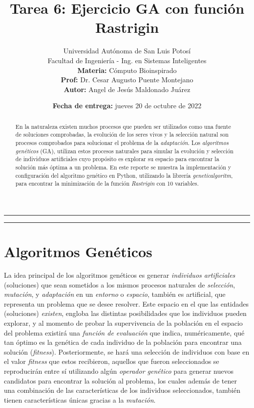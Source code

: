 \documentclass[a4paper, 12pt]{article}
\title{\vspace{-3cm}Tarea 6: Ejercicio GA con función Rastrigin}
\author{
    Universidad Autónoma de San Luis Potosí\\ 
    Facultad de Ingeniería - Ing. en Sistemas Inteligentes\\ 
    \textbf{Materia:} Cómputo Bioinspirado \\
    \textbf{Prof:} Dr. Cesar Augusto Puente Montejano  \\
    \textbf{Autor:} Angel de Jesús Maldonado Juárez
}
\date{\textbf{Fecha de entrega:} jueves 20 de octubre de 2022}
\begin{document}
\maketitle

\begin{center}
    \rule{\textwidth}{0.5pt}
    \begin{abstract}
        \noindent En la naturaleza existen muchos procesos que pueden ser utilizados como una fuente de soluciones comprobadas, la evolución de los seres vivos y la selección natural son procesos comprobados para solucionar el problema de la \emph{adaptación}. Los \emph{algoritmos genéticos} (GA), utilizan estos procesos naturales para simular la evolución y selección de individuos artificiales cuyo propósito es explorar su espacio para encontrar la solución más óptima a un problema. En este reporte se muestra la implementación y configuración del algoritmo genético en Python, utilizando la librería \emph{geneticalgoritm}, para encontrar la minimización de la función \emph{Rastrigin} con 10 variables.
    \end{abstract}
    \rule{\textwidth}{0.5pt}
\end{center}

\section{Algoritmos Genéticos}
La idea principal de los algoritmos genéticos es generar \emph{individuos artificiales} (soluciones) que sean sometidos a los mismos procesos naturales de \emph{selección}, \emph{mutación}, y \emph{adaptación} en un \emph{entorno} o \emph{espacio}, también es artificial, que representa un problema que se desee resolver. Este espacio en el que las entidades (soluciones) \emph{existen}, engloba las distintas posibilidades que los individuos pueden explorar, y al momento de probar la supervivencia de la población en el espacio del problema existirá una \emph{función de evaluación} que indica, numéricamente, qué tan óptimo es la genética de cada individuo de la población para encontrar una solución (\emph{fitness}). Posteriormente, se hará una selección de individuos con base en el valor \emph{fitness} que estos recibieron, aquellos que fueron seleccionados se reproducirán entre sí utilizando algún \emph{operador genético} para generar nuevos candidatos para encontrar la solución al problema, los cuales además de tener una combinación de las características de los individuos seleccionados, también tienen características únicas gracias a la \emph{mutación}.
\end{document}

